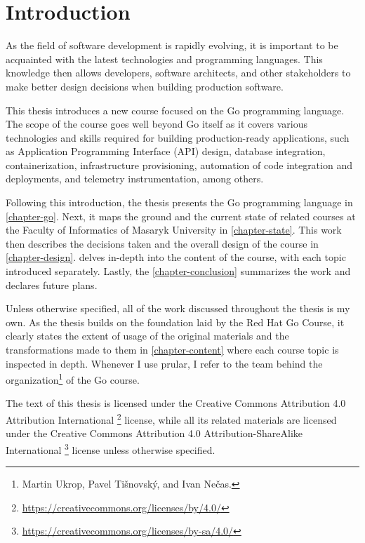 \documentclass[
  digital,
  color,
  oneside,
  nosansbold,
  nocolorbold,
  nolof,
  nolot,
]{fithesis4}
\begin{document}
\chapter{Introduction}

As the field of software development is rapidly evolving, it is important to be acquainted with the latest technologies and programming languages. This knowledge then allows developers, software architects, and other stakeholders to make better design decisions when building production software.

This thesis introduces a new course focused on the Go\cite{go} programming language. The scope of the course goes well beyond Go itself as it covers various technologies and skills required for building production-ready applications, such as Application Programming Interface (API) design, database integration, containerization, infrastructure provisioning, automation of code integration and deployments, and telemetry instrumentation, among others.

Following this introduction, the thesis presents the Go programming language in \cref{chapter-go}. Next, it maps the ground and the current state of related courses at the Faculty of Informatics of Masaryk University in \cref{chapter-state}. This work then describes the decisions taken and the overall design of the course in \cref{chapter-design}.  delves in-depth into the content of the course, with each topic introduced separately. Lastly, the \cref{chapter-conclusion} summarizes the work and declares future plans.

Unless otherwise specified, all of the work discussed throughout the thesis is my own. As the thesis builds on the foundation laid by the Red Hat Go Course\cite{redhat-go-course}, it clearly states the extent of usage of the original materials and the transformations made to them in \cref{chapter-content} where each course topic is inspected in depth. Whenever I use prular, I refer to the team behind the organization\footnote{Martin Ukrop, Pavel Tišnovský, and Ivan Nečas.} of the Go course.

The text of this thesis is licensed under the Creative Commons Attribution 4.0 Attribution International \footnote{\url{https://creativecommons.org/licenses/by/4.0/}} license, while all its related materials are licensed under the Creative Commons Attribution 4.0 Attribution-ShareAlike International \footnote{\url{https://creativecommons.org/licenses/by-sa/4.0/}} license unless otherwise specified.
\end{document}
